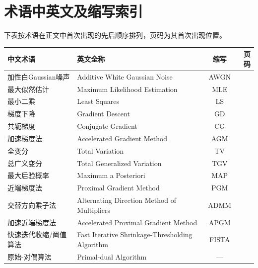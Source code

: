 \documentclass[12pt]{article}
\begin{document}
\section{术语中英文及缩写索引}
下表按术语在正文中首次出现的先后顺序排列，页码为其首次出现位置。
\begin{table}[ht]
    \small
    \centering
    \begin{tabularx}{\textwidth}{l X c r}
        \toprule
        \textbf{中文术语} & \textbf{英文全称} & \textbf{缩写} & \textbf{页码} \\
        \midrule
        加性白Gaussian噪声 & Additive White Gaussian Noise & AWGN & \pageref{term:AWGN} \\
        最大似然估计 & Maximum Likelihood Estimation & MLE & \pageref{term:MLE} \\
        最小二乘 & Least Squares & LS & \pageref{term:LS} \\
        梯度下降 & Gradient Descent & GD & \pageref{term:GD} \\
        共轭梯度 & Conjugate Gradient & CG & \pageref{term:CG} \\
        加速梯度法 & Accelerated Gradient Method & AGM & \pageref{term:AGM} \\
        全变分 & Total Variation & TV & \pageref{term:TV} \\
        总广义变分 & Total Generalized Variation & TGV & \pageref{term:TGV} \\
        最大后验概率 & Maximum a Posteriori & MAP & \pageref{term:MAP} \\
        近端梯度法 & Proximal Gradient Method & PGM & \pageref{term:PGM} \\
        交替方向乘子法 & Alternating Direction Method of Multipliers & ADMM & \pageref{term:ADMM} \\
        加速近端梯度法 & Accelerated Proximal Gradient Method & APGM & \pageref{term:APGM} \\
        快速迭代收缩/阈值算法 & Fast Iterative Shrinkage-Thresholding Algorithm & FISTA & \pageref{term:FISTA} \\
        原始-对偶算法 & Primal-dual Algorithm & --- & \pageref{term:PD} \\
        \bottomrule
    \end{tabularx}
\end{table}

\printbibliography
\end{document}

